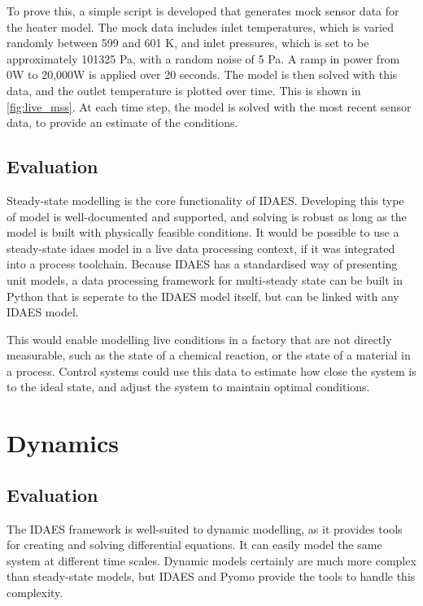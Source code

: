 \documentclass[12pt]{article}
\begin{document}
To prove this, a simple script is developed that generates mock sensor data for the heater model. The mock data includes inlet temperatures, which is varied randomly between 599 and 601 K, and inlet pressures, which is set to be approximately 101325 Pa, with a random noise of 5 Pa. A ramp in power from 0W to 20,000W is applied over 20 seconds. The model is then solved with this data, and the outlet temperature is plotted over time. This is shown in \cref{fig:live_mss}. At each time step, the model is solved with the most recent sensor data, to provide an estimate of the conditions.


\subsection{Evaluation}


Steady-state modelling is the core functionality of IDAES. Developing this type of model is well-documented and supported, and solving is robust as long as the model is built with physically feasible conditions.
It would be possible to use a steady-state idaes model in a live data processing context, if it was integrated into a process toolchain. Because IDAES has a standardised way of presenting unit models, a data processing framework for multi-steady state can be built in Python that is seperate to the IDAES model itself, but can be linked with any IDAES model.

This would enable modelling live conditions in a factory that are not directly measurable, such as the state of a chemical reaction, or the state of a material in a process. Control systems could use this data to estimate how close the system is to the ideal state, and adjust the system to maintain optimal conditions.






\section{Dynamics}

\subsection{Evaluation}
The IDAES framework is well-suited to dynamic modelling, as it provides tools for creating and solving differential equations. It can easily model the same system at different time scales. Dynamic models certainly are much more complex than steady-state models, but IDAES and Pyomo provide the tools to handle this complexity.
\end{document}
